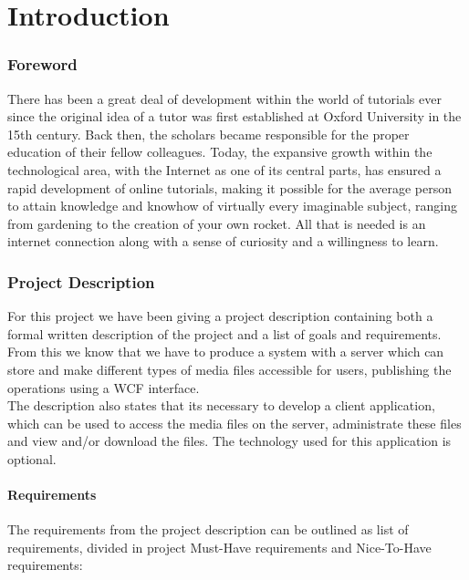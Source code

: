 \part{Introduction}
\section{Foreword}
There has been a great deal of development within the world of tutorials ever since the original idea of a tutor was first established at Oxford University in the 15th century. Back then, the scholars became responsible for the proper education of their fellow colleagues. Today, the expansive growth within the technological area, with the Internet as one of its central parts, has ensured a rapid development of online tutorials, making it possible for the average person to attain knowledge and knowhow of virtually every imaginable subject, ranging from gardening to the creation of your own rocket.
All that is needed is an internet connection along with a sense of curiosity and a willingness to learn.\\


\section{Project Description}
For this project we have been giving a project description containing both a formal written description of the project and a list of goals and requirements. From this we know that we have to produce a system with a server which can store and make different types of media files accessible for users, publishing the operations using a WCF interface.\\
The description also states that its necessary to develop a client application, which can be used to access the media files on the server, administrate these files and view and/or download the files. The technology used for this application is optional.\\

\subsection{Requirements} \label{Requirements}
The requirements from the project description can be outlined as list of requirements, divided in project Must-Have requirements and Nice-To-Have requirements:

